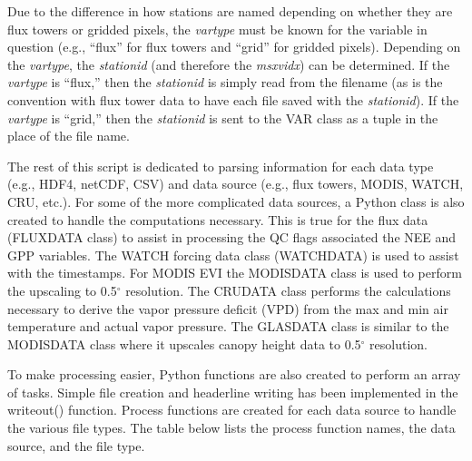 Due to the difference in how stations are named depending on whether they are flux towers or gridded pixels, the \textit{vartype} must be known for the variable in question (e.g., ``flux'' for flux towers and ``grid'' for gridded pixels).  
Depending on the \textit{vartype}, the \textit{stationid} (and therefore the \textit{msxvidx}) can be determined.  If the \textit{vartype} is ``flux,'' then the \textit{stationid} is simply read from the filename (as is the convention with flux tower data to have each file saved with the \textit{stationid}).  
If the \textit{vartype} is ``grid,'' then the \textit{stationid} is sent to the VAR class as a tuple in the place of the file name.

The rest of this script is dedicated to parsing information for each data type (e.g., HDF4, netCDF, CSV) and data source (e.g., flux towers, MODIS, WATCH, CRU, etc.).  
For some of the more complicated data sources, a Python class is also created to handle the computations necessary.  
This is true for the flux data (FLUXDATA class) to assist in processing the QC flags associated the NEE and GPP variables.  
The WATCH forcing data class (WATCHDATA) is used to assist with the timestamps.  
For MODIS EVI the MODISDATA class is used to perform the upscaling to 0.5$^{\circ}$ resolution.  
The CRUDATA class performs the calculations necessary to derive the vapor pressure deficit (VPD) from the max and min air temperature and actual vapor pressure.  
The GLASDATA class is similar to the MODISDATA class where it upscales canopy height data to 0.5$^{\circ}$ resolution.  

To make processing easier, Python functions are also created to perform an array of tasks.  
Simple file creation and headerline writing has been implemented in the writeout() function.  
Process functions are created for each data source to handle the various file types. 
The table below lists the process function names, the data source, and the file type.

